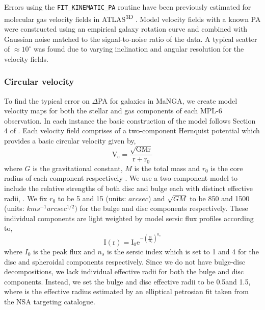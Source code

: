 Errors using the \texttt{FIT\_KINEMATIC\_PA} routine have been previously estimated for molecular gas velocity fields in ATLAS\textsuperscript{3D} \citep{davis2011a}. Model velocity fields with a known PA were constructed using an empirical galaxy rotation curve and combined with Gaussian noise matched to the signal-to-noise ratio of the data. A typical scatter of $\approx10^{\circ}$ was found due to varying inclination and angular resolution for the velocity fields.

\subsubsection{Circular velocity}
To find the typical error on $\Delta$PA for galaxies in MaNGA, we create model velocity maps for both the stellar and gas components of each MPL-6 observation. In each instance the basic construction of the model follows Section 4 of \citet{krajnovic2006}. Each velocity field comprises of a two-component Hernquist potential which provides a basic circular velocity given by,
\begin{equation}
\mathrm{V_c = \frac{\sqrt{GMr}}{r+r_0}}
\end{equation}
where $G$ is the gravitational constant, $M$ is the total mass and $r_0$ is the core radius of each component respectively \citep{hernquist1990}. We use a two-component model to include the relative strengths of both disc and bulge each with distinct effective radii, \re. We fix $r_0$ to be 5 and 15 (units: $arcsec$) and $\sqrt{GM}$ to be 850 and 1500 (units: $km s^{-1} arcsec^{1/2}) $ for the bulge and disc components respectively. These individual components are light weighted by model sersic flux profiles according to,
\begin{equation}
\mathrm{I(r) = I_0 e^{-\left(\frac{R}{R_e}\right)^{n_s}}}
\end{equation}
where $I_{0}$ is the peak flux and $n_s$ is the sersic index which is set to 1 and 4 for the disc and spheroidal components respectively. Since we do not have bulge-disc decompositions, we lack individual effective radii for both the bulge and disc components. Instead, we set the bulge and disc effective radii to be 0.5\re and 1.5\re, where \re is the effective radius estimated by an elliptical petrosian fit taken from the NSA targeting catalogue. 

